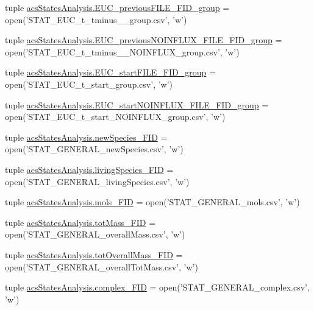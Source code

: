 \begin{DoxyCompactItemize}
tuple \hyperlink{a00130_adf079c2d443f89f00a330a58f99c2095}{acs\-States\-Analysis.\-E\-U\-C\-\_\-previous\-F\-I\-L\-E\-\_\-\-F\-I\-D\-\_\-group} = open('S\-T\-A\-T\-\_\-\-E\-U\-C\-\_\-t\-\_\-tminus\-\_\-\_\-group.\-csv', 'w')
\item 
tuple \hyperlink{a00130_ace5cf628b305f9110e058d7dafd27fb4}{acs\-States\-Analysis.\-E\-U\-C\-\_\-previous\-N\-O\-I\-N\-F\-L\-U\-X\-\_\-\-F\-I\-L\-E\-\_\-\-F\-I\-D\-\_\-group} = open('S\-T\-A\-T\-\_\-\-E\-U\-C\-\_\-t\-\_\-tminus\-\_\-\_\-\-N\-O\-I\-N\-F\-L\-U\-X\-\_\-group.\-csv', 'w')
\item 
tuple \hyperlink{a00130_abe1a2acadc97e46d55c6f4164c0890dc}{acs\-States\-Analysis.\-E\-U\-C\-\_\-start\-F\-I\-L\-E\-\_\-\-F\-I\-D\-\_\-group} = open('S\-T\-A\-T\-\_\-\-E\-U\-C\-\_\-t\-\_\-start\-\_\-group.\-csv', 'w')
\item 
tuple \hyperlink{a00130_aef08a333d5fed02e90483cc87e389ed0}{acs\-States\-Analysis.\-E\-U\-C\-\_\-start\-N\-O\-I\-N\-F\-L\-U\-X\-\_\-\-F\-I\-L\-E\-\_\-\-F\-I\-D\-\_\-group} = open('S\-T\-A\-T\-\_\-\-E\-U\-C\-\_\-t\-\_\-start\-\_\-\-N\-O\-I\-N\-F\-L\-U\-X\-\_\-group.\-csv', 'w')
\item 
tuple \hyperlink{a00130_abdb6e583333cc08cac8c63631db80b5b}{acs\-States\-Analysis.\-new\-Species\-\_\-\-F\-I\-D} = open('S\-T\-A\-T\-\_\-\-G\-E\-N\-E\-R\-A\-L\-\_\-new\-Species.\-csv', 'w')
\item 
tuple \hyperlink{a00130_ab7bbe9440116d34c9a373c40fc59bb3d}{acs\-States\-Analysis.\-living\-Species\-\_\-\-F\-I\-D} = open('S\-T\-A\-T\-\_\-\-G\-E\-N\-E\-R\-A\-L\-\_\-living\-Species.\-csv', 'w')
\item 
tuple \hyperlink{a00130_a603a41889d8732146d44da83ffaf0489}{acs\-States\-Analysis.\-mols\-\_\-\-F\-I\-D} = open('S\-T\-A\-T\-\_\-\-G\-E\-N\-E\-R\-A\-L\-\_\-mols.\-csv', 'w')
\item 
tuple \hyperlink{a00130_a1b7f5672822b59c7284cd2b703aacbc2}{acs\-States\-Analysis.\-tot\-Mass\-\_\-\-F\-I\-D} = open('S\-T\-A\-T\-\_\-\-G\-E\-N\-E\-R\-A\-L\-\_\-overall\-Mass.\-csv', 'w')
\item 
tuple \hyperlink{a00130_a20a06acdb6e82bcaab87d2781d3555a9}{acs\-States\-Analysis.\-tot\-Overall\-Mass\-\_\-\-F\-I\-D} = open('S\-T\-A\-T\-\_\-\-G\-E\-N\-E\-R\-A\-L\-\_\-overall\-Tot\-Mass.\-csv', 'w')
\item 
tuple \hyperlink{a00130_ace41560d233dff88c3073be734bae944}{acs\-States\-Analysis.\-complex\-\_\-\-F\-I\-D} = open('S\-T\-A\-T\-\_\-\-G\-E\-N\-E\-R\-A\-L\-\_\-complex.\-csv', 'w')
\item 

\end{DoxyCompactItemize}
